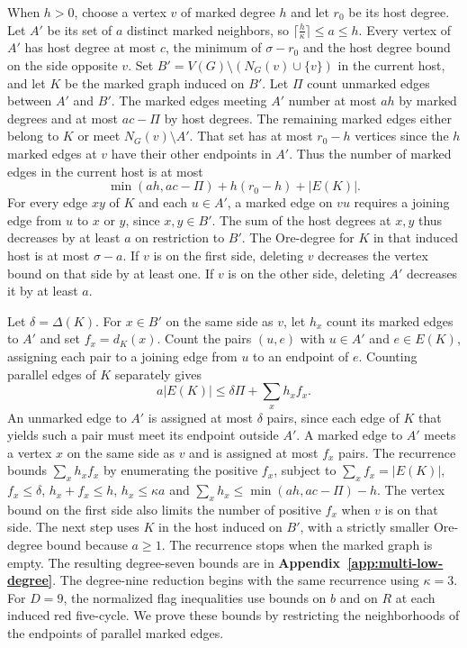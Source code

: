 \documentclass[preprint,11pt,numbers]{elsarticle-arxiv}
\numberwithin{equation}{section}
\theoremstyle{definition}
\begin{document}
When $h>0$, choose a vertex $v$ of marked degree $h$ and let
$r_0$ be its host degree. Let $A'$ be its set of $a$ distinct
marked neighbors, so $\lceil\frac{h}{\kappa}\rceil\le a\le h$.
Every vertex of $A'$ has host degree at most $c$, the minimum
of $\sigma-r_0$ and the host degree bound on the side opposite
$v$. Set $B'=V(G)\setminus(N_G(v)\cup\{v\})$ in the current
host, and let $K$ be the marked graph induced on $B'$. Let
$\Pi$ count unmarked edges between $A'$ and $B'$. The marked
edges meeting $A'$ number at most $ah$ by marked degrees and
at most $ac-\Pi$ by host degrees. The remaining marked edges
either belong to $K$ or meet $N_G(v)\setminus A'$. That set
has at most $r_0-h$ vertices since the $h$ marked edges at
$v$ have their other endpoints in $A'$. Thus the number of
marked edges in the current host is at most
\begin{equation}\label{eq:finite-bipartite-root-count}
 \min(ah,ac-\Pi)+h(r_0-h)+|E(K)|.
\end{equation}
For every edge $xy$ of $K$ and each $u\in A'$, a marked
edge on $vu$ requires a joining edge from $u$ to $x$ or $y$,
since $x,y\in B'$. The sum of the host degrees at $x,y$ thus
decreases by at least $a$ on restriction to $B'$. The
Ore-degree for $K$ in that induced host is at most $\sigma-a$.
If $v$ is on the first side, deleting $v$ decreases the vertex
bound on that side by at least one. If $v$ is on the other
side, deleting $A'$ decreases it by at least $a$.

Let $\delta=\Delta(K)$. For $x\in B'$ on the same side as
$v$, let $h_x$ count its marked edges to $A'$ and set
$f_x=d_K(x)$. Count the pairs $(u,e)$ with $u\in A'$ and
$e\in E(K)$, assigning each pair to a joining edge from
$u$ to an endpoint of $e$. Counting parallel edges of $K$
separately gives
\[
 a|E(K)|\le\delta\Pi+\sum_x h_xf_x.
\]
An unmarked edge to $A'$ is assigned at most $\delta$ pairs,
since each edge of $K$ that yields such a pair must meet its
endpoint outside $A'$. A marked edge to $A'$ meets a vertex
$x$ on the same side as $v$ and is assigned at most $f_x$
pairs. The recurrence bounds $\sum_x h_x f_x$ by enumerating
the positive $f_x$, subject to
$\sum_x f_x=|E(K)|$, $f_x\le\delta$, $h_x+f_x\le h$,
$h_x\le\kappa a$ and $\sum_x h_x\le\min(ah,ac-\Pi)-h$.
The vertex bound on the first side also limits the number of
positive $f_x$ when $v$ is on that side. The next step uses
$K$ in the host induced on $B'$, with a strictly smaller
Ore-degree bound because $a\ge1$. The recurrence stops when
the marked graph is empty. The resulting degree-seven bounds
are in \textbf{Appendix~\ref{app:multi-low-degree}}. The
degree-nine reduction begins with the same recurrence using
$\kappa=3$.
\relax\space%
For $D=9$, the normalized flag inequalities use bounds on $b$
and on $R$ at each induced red five-cycle. We prove these bounds
by restricting the neighborhoods of the endpoints of parallel
marked edges.
\end{document}
